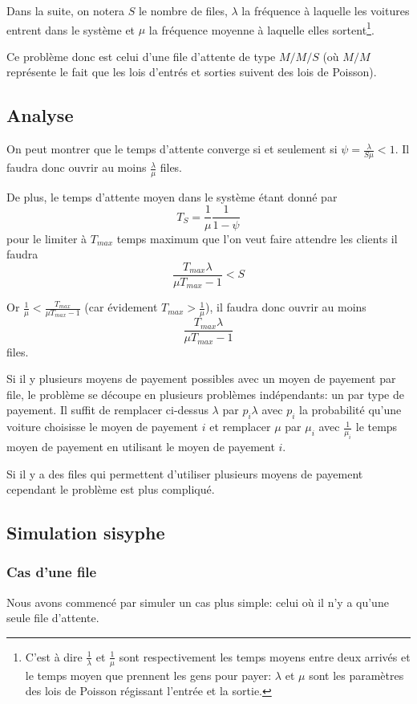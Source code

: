 \documentclass{scrartcl}
\begin{document}
  Dans la suite, on notera $S$ le nombre de files, $\lambda$ la fréquence à
  laquelle les voitures entrent dans le système et $\mu$ la fréquence moyenne à
  laquelle elles sortent\footnote{C'est à dire $\frac 1 \lambda$ et
  $\frac 1 \mu$ sont respectivement les temps moyens entre deux arrivés et le
  temps moyen que prennent les gens pour payer: $\lambda$ et $\mu$ sont les
  paramètres des lois de Poisson régissant l'entrée et la sortie.}.

  Ce problème donc est celui d'une file d'attente de type $M/M/S$ (où $M/M$
  représente le fait que les lois d'entrés et sorties suivent des lois de
  Poisson).

  \subsection{Analyse}
    On peut montrer que le temps d'attente converge si et seulement si $\psi =
    \frac \lambda {S\mu} < 1$. Il faudra donc ouvrir au moins $\frac \lambda
    \mu$ files.

    De plus, le temps d'attente moyen dans le système étant donné par
      \[T_S = \frac 1 \mu \frac 1 {1-\psi}\]
    pour le limiter à $T_{max}$ temps maximum que l'on veut faire attendre les
    clients il faudra \[\frac {T_{max}\lambda}{\mu T_{max}-1} < S\]

    Or $\frac 1 \mu < \frac{T_{max}}{\mu T_{max}-1}$ (car évidement $T_{max} >
    \frac 1 \mu$), il faudra donc ouvrir au moins
      \[\frac{T_{max}\lambda}{\mu T_{max}-1}\]
    files.

    Si il y plusieurs moyens de payement possibles avec un moyen de payement
    par file, le problème se découpe en plusieurs problèmes indépendants: un
    par type de payement. Il suffit de remplacer ci-dessus $\lambda$ par
    $p_i\lambda$ avec $p_i$ la probabilité qu'une voiture choisisse le moyen de
    payement $i$ et remplacer $\mu$ par $\mu_i$ avec $\frac 1 {\mu_i}$ le temps
    moyen de payement en utilisant le moyen de payement $i$.

    Si il y a des files qui permettent d'utiliser plusieurs moyens de payement
    cependant le problème est plus compliqué.

  \subsection{Simulation sisyphe}
    \subsubsection{Cas d'une file}
      Nous avons commencé par simuler un cas plus simple: celui où il n'y a
      qu'une seule file d'attente.
\end{document}
